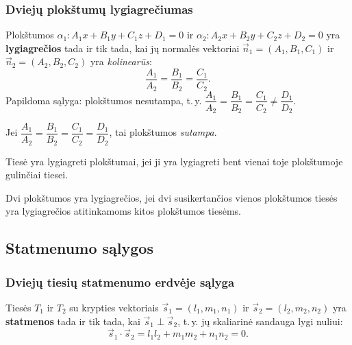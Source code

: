 \subsubsection*{Dviejų plokštumų lygiagrečiumas}

\begin{theorem}
Plokštumos $\alpha_1\colon A_1 x + B_1 y + C_1 z + D_1 = 0$ ir
$\alpha_2\colon A_2 x + B_2 y + C_2 z + D_2 = 0$ yra \textbf{lygiagrečios}
tada ir tik tada, kai jų normalės vektoriai
$\vec{n}_1 = (A_1, B_1, C_1)$ ir $\vec{n}_2 = (A_2, B_2, C_2)$ yra
\emph{kolinearūs}:
\[
  \frac{A_1}{A_2} = \frac{B_1}{B_2} = \frac{C_1}{C_2}.
\]
Papildoma sąlyga: plokštumos nesutampa, t.\,y.
$\dfrac{A_1}{A_2} = \dfrac{B_1}{B_2} = \dfrac{C_1}{C_2} \neq \dfrac{D_1}{D_2}$.
\end{theorem}

\begin{remark}
Jei $\dfrac{A_1}{A_2} = \dfrac{B_1}{B_2} = \dfrac{C_1}{C_2} = \dfrac{D_1}{D_2}$,
tai plokštumos \emph{sutampa}.
\end{remark}

\begin{theorem}
Tiesė yra lygiagreti plokštumai, jei ji yra lygiagreti bent vienai toje
plokštumoje gulinčiai tiesei.

Dvi plokštumos yra lygiagrečios, jei dvi susikertančios vienos plokštumos
tiesės yra lygiagrečios atitinkamoms kitos plokštumos tiesėms.
\end{theorem}

\subsection{Statmenumo sąlygos}

\subsubsection*{Dviejų tiesių statmenumo erdvėje sąlyga}

\begin{theorem}
Tiesės $T_1$ ir $T_2$ su krypties vektoriais $\vec{s}_1 = (l_1, m_1, n_1)$ ir
$\vec{s}_2 = (l_2, m_2, n_2)$ yra \textbf{statmenos} tada ir tik tada, kai
$\vec{s}_1 \perp \vec{s}_2$, t.\,y. jų skaliarinė sandauga lygi nuliui:
\[
  \vec{s}_1 \cdot \vec{s}_2 = l_1 l_2 + m_1 m_2 + n_1 n_2 = 0.
\]
\end{theorem}

